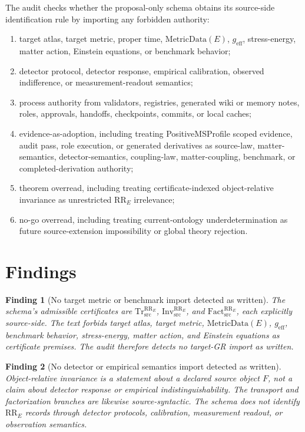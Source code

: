 \documentclass[11pt]{article}
\newcommand{\RRE}{\mathrm{RR}_{E}}
\newcommand{\TrRR}{\mathrm{Tr}^{\RRE}_{\mathrm{src}}}
\newcommand{\InvRR}{\mathrm{Inv}^{\RRE}_{\mathrm{src}}}
\newcommand{\FactRR}{\mathrm{Fact}^{\RRE}_{\mathrm{src}}}
\newcommand{\MetricData}{\mathrm{MetricData}}
\newcommand{\geff}{g_{\mathrm{eff}}}
\newtheorem{finding}{Finding}
\begin{document}
The audit checks whether the proposal-only schema obtains its source-side
identification rule by importing any forbidden authority:
\begin{enumerate}[label=(\arabic*)]
  \item target atlas, target metric, proper time, \(\MetricData(E)\), \(\geff\),
  stress-energy, matter action, Einstein equations, or benchmark behavior;
  \item detector protocol, detector response, empirical calibration, observed
  indifference, or measurement-readout semantics;
  \item process authority from validators, registries, generated wiki or
  memory notes, roles, approvals, handoffs, checkpoints, commits, or local
  caches;
  \item evidence-as-adoption, including treating PositiveMSProfile scoped
  evidence, audit pass, role execution, or generated derivatives as source-law,
  matter-semantics, detector-semantics, coupling-law, matter-coupling,
  benchmark, or completed-derivation authority;
  \item theorem overread, including treating certificate-indexed object-relative
  invariance as unrestricted \(\RRE\) irrelevance;
  \item no-go overread, including treating current-ontology underdetermination
  as future source-extension impossibility or global theory rejection.
\end{enumerate}

\section{Findings}

\begin{finding}[No target metric or benchmark import detected as written]
The schema's admissible certificates are \(\TrRR\), \(\InvRR\), and
\(\FactRR\), each explicitly source-side. The text forbids target atlas, target
metric, \(\MetricData(E)\), \(\geff\), benchmark behavior, stress-energy,
matter action, and Einstein equations as certificate premises. The audit
therefore detects no target-GR import as written.
\end{finding}

\begin{finding}[No detector or empirical semantics import detected as written]
Object-relative invariance is a statement about a declared source object
\(F\), not a claim about detector response or empirical indistinguishability.
The transport and factorization branches are likewise source-syntactic. The
schema does not identify \(\RRE\) records through detector protocols,
calibration, measurement readout, or observation semantics.
\end{finding}
\end{document}
